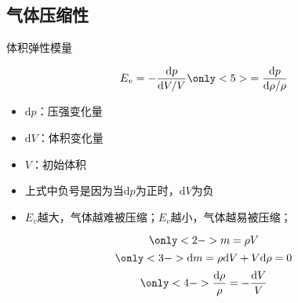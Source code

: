 \subsection{气体压缩性}
\begin{frame}{体积弹性模量}
  \vspace*{-0.5em}
  \begin{definition}[体积弹性模量]
    \begin{equation*}
      E_{v}
      =
      -\frac{\mathrm{d}p}{\mathrm{d}V/V}
      \only<5>{
        =
        \frac{\mathrm{d}p}{\mathrm{d}\rho/\rho}
      }
    \end{equation*}
    \vspace*{-1em}
    \begin{itemize}
      \item $\mathrm{d}p$：压强变化量
      \item $\mathrm{d}V$：体积变化量
      \item $V$：初始体积
      \item 上式中负号是因为当$\mathrm{d}p$为正时，$\mathrm{d}V$为负
      \item $E_{v}$越大，气体越难被压缩；$E_{v}$越小，气体越易被压缩；
    \end{itemize}
  \end{definition}
  \vspace*{-1.5em}
  \begin{equation*}
    \only<2->{
      m = \rho V
    }
  \end{equation*}
  \begin{equation*}
    \only<3->{
      \mathrm{d}m
      =
      \rho\mathrm{d}V
      +
      V\mathrm{d}\rho
      =
      0
    }
  \end{equation*}
  \begin{equation*}
    \only<4->{
      \frac{\mathrm{d}\rho}{\rho}
      =
      -\frac{\mathrm{d}V}{V}
    }
  \end{equation*}
\end{frame}


